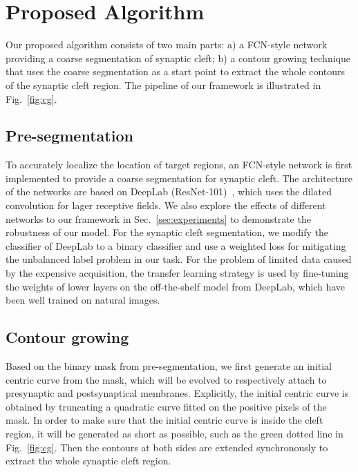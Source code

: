 \section{Proposed Algorithm}
\label{sec:algorithm}


Our proposed algorithm consists of two main parts:
a) a FCN-style network providing a coarse segmentation of synaptic cleft;
b) a contour growing technique that uses the coarse segmentation as a start point to extract the whole contours of the synaptic cleft region.
The pipeline of our framework is illustrated in Fig.~\ref{fig:cg}.

\subsection{Pre-segmentation}
To accurately localize the location of target regions, an FCN-style network is first implemented to provide a coarse segmentation for synaptic cleft.
The architecture of the networks are based on DeepLab (ResNet-101)~\cite{Chen2016a}, which uses the dilated convolution for lager receptive fields.
%
We also explore the effects of different networks to our framework in Sec.~\ref{sec:experiments} to demonstrate the robustness of our model.
%
For the synaptic cleft segmentation, we modify the classifier of DeepLab to a binary classifier and use a weighted loss for mitigating the unbalanced label problem in our task.
For the problem of limited data caused by the expensive acquisition, the transfer learning strategy is used by fine-tuning the weights of lower layers on the off-the-shelf model from DeepLab, which have been well trained on natural images.


\subsection{Contour growing}

Based on the binary mask from pre-segmentation, we first generate an initial centric curve from the mask, which will be evolved to respectively attach to presynaptic and postsynaptical membranes.
%
Explicitly, the initial centric curve is obtained by truncating a quadratic curve fitted on the positive pixels of the mask.
%
In order to make sure that the initial centric curve is inside the cleft region, it will be generated as short as possible, such as the green dotted line in Fig.~\ref{fig:cg}.
%
Then the contours at both sides are extended synchronously to extract the whole synaptic cleft region.




